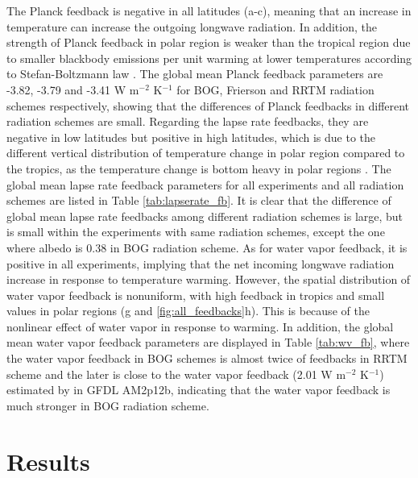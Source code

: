 The Planck feedback is negative in all latitudes (a-c), meaning that an increase in temperature can increase the outgoing longwave radiation. In addition, the strength of Planck feedback in polar region is weaker than the tropical region due to smaller blackbody emissions per unit warming at lower temperatures according to Stefan-Boltzmann law \citep{Goosse2018}. The global mean Planck feedback parameters are -3.82, -3.79 and -3.41 W m$^{-2}$ K$^{-1}$ for BOG, Frierson and RRTM radiation schemes respectively, showing that the differences of Planck feedbacks in different radiation schemes are small. Regarding the lapse rate feedbacks, they are negative in low latitudes but positive in high latitudes, which is due to the different vertical distribution of temperature change in polar region compared to the tropics, as the temperature change is bottom heavy in polar regions \citep{Pithan2014}. The global mean lapse rate feedback parameters for all experiments and all radiation schemes are listed in Table \ref{tab:lapserate_fb}. It is clear that the difference of global mean lapse rate feedbacks among different radiation schemes is large, but is small within the experiments with same radiation schemes, except the one where albedo is 0.38 in BOG radiation scheme. As for water vapor feedback, it is positive in all experiments, implying that the net incoming longwave radiation increase in response to temperature warming. However, the spatial distribution of water vapor feedback is nonuniform, with high feedback in tropics and small values in polar regions (g and \ref{fig:all_feedbacks}h). This is because of the nonlinear effect of water vapor in response to warming.  In addition, the global mean water vapor feedback parameters are displayed in Table \ref{tab:wv_fb}, where the water vapor feedback in BOG schemes is almost twice of feedbacks in RRTM scheme and the later is close to the water vapor feedback (2.01 W m$^{-2}$ K$^{-1}$) estimated by \cite{Soden2008} in GFDL AM2p12b, indicating that the water vapor feedback is much stronger in BOG radiation scheme.



\section{Results}
\label{sec:results}

